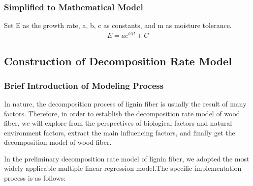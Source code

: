 \documentclass[12pt]{article}
\begin{document}
%

\subsubsection{Simplified to Mathematical Model}
Set E as the growth rate, a, b, c as constants, and m as moisture tolerance.
\begin{equation}
	\begin{array}{l}
		E=ae^{bM} + C
	\end{array}
\end{equation}

\subsection{Construction of Decomposition Rate Model}
\subsubsection{Brief Introduction of Modeling Process}


In nature, the decomposition process of lignin fiber \cite{} is usually the result of many factors. Therefore, in order to establish the decomposition rate model of wood fiber, we will explore from the perspectives of biological factors and natural environment factors, extract the main influencing factors, and finally get the decomposition model of wood fiber.\par

In the preliminary decomposition rate model of lignin fiber, we adopted the most widely applicable multiple linear regression model.The specific implementation process is as follows: \par
\end{document}
